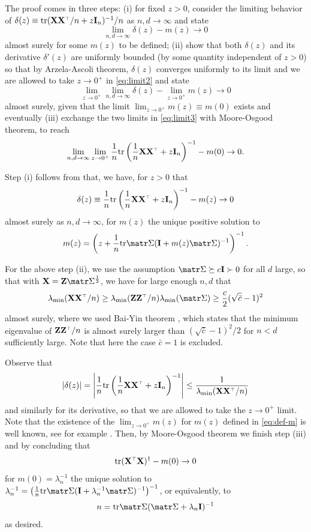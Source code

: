 \documentclass[../../thesis.tex]{subfiles}
\begin{document}
The proof comes in three steps: (i) for fixed $z > 0$, consider the limiting behavior of $ \delta(z) \equiv \tr (\X \X^\top/n + z \I_n)^{-1}/n$ as $n,d \to \infty$ and state
\begin{equation}\label{eq:limit2}
  \lim_{n,d \to \infty} \delta(z) - m(z) \to 0
\end{equation}
almost surely for some $m(z)$ to be defined; (ii) show that both $\delta(z)$ and its derivative $\delta'(z)$ are uniformly bounded (by some quantity independent of $z>0$) so that by Arzela-Ascoli theorem, $\delta(z)$ converges uniformly to its limit and we are allowed to take $z \to 0^+$ in \eqref{eq:limit2} and state
\begin{equation}\label{eq:limit3}
  \lim_{z \to 0^+} \lim_{n,d \to \infty} \delta(z) - \lim_{z \to 0^+} m(z) \to 0
\end{equation}
almost surely, given that the limit $\lim_{z \to 0^+} m(z) \equiv m(0)$ exists and eventually (iii) exchange the two limits in \eqref{eq:limit3} with Moore-Osgood theorem, to reach
\[
  \lim_{n,d \to \infty} \lim_{z \to 0^+} \frac1n \tr \left(\frac1n \X \X^\top + z \I_n \right)^{-1} - m(0) \to 0.
\]

Step (i) follows from \cite{silverstein1995empirical} that, we have, for $z > 0$ that
\[
  \delta(z) \equiv \frac1n \tr \left( \frac1n \X \X^\top  + z \I_n \right)^{-1}  - m(z) \to 0
\]
almost surely as $n,d \to \infty$, for $m(z)$ the unique positive solution to
\begin{equation}\label{eq:def-m}
  m(z) = \left( z + \frac1n \tr \Sigmab (\I + m(z) \Sigmab)^{-1} \right)^{-1}.
\end{equation}

For the above step (ii), we use the assumption $\Sigmab \succeq c \I \succ 0$
for all $d$ large, so that with $\X = \Z \Sigmab^{\frac12}$, we have for large enough $n,d$ that
\[
  \lambda_{\min} (\X \X^\top/n) \ge \lambda_{\min} (\Z \Z^\top/n) \lambda_{\min} (\Sigmab) \ge \frac{c}2 (\sqrt{\bar c} - 1 )^2
\]
almost surely, where we used Bai-Yin theorem \cite{bai1993limit}, which states that the minimum eigenvalue of $\Z \Z^\top/n$ is almost surely larger than $( \sqrt{\bar c} - 1 )^2/2$ for $n<d$ sufficiently large. Note that here the case $\bar c = 1$ is excluded.

Observe that
\[
  |\delta(z)| = \left| \frac1n \tr \left( \frac1n \X \X^\top  + z \I_n \right)^{-1} \right| \le \frac1{ \lambda_{\min} (\X \X^\top/n) }
\]
and similarly for its derivative, so that we are allowed to take the $z \to 0^+$ limit. Note that the existence of the $\lim_{z \to 0^+} m(z)$ for $m(z)$ defined in \eqref{eq:def-m} is well known, see for example \cite{ledoit2011eigenvectors}. Then, by Moore-Osgood theorem we finish step (iii) and by concluding that
\[
  \tr (\X^\top \X)^\dagger - m(0) \to 0
\]
for $m(0) = \lambda_n^{-1}$ the unique solution to $\lambda_n^{-1} = \left( \frac1n \tr \Sigmab (\I + \lambda_n^{-1} \Sigmab)^{-1} \right)^{-1}$, or equivalently, to
\[
  n = \tr \Sigmab (\Sigmab + \lambda_n \I)^{-1}
\]
as desired.
\end{document}
